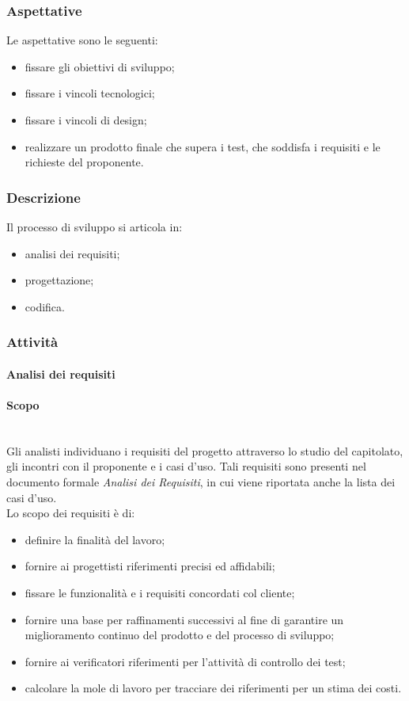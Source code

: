 \subsubsection{Aspettative}
Le aspettative sono le seguenti:
	\begin{itemize}
		\item fissare gli obiettivi di sviluppo;
		\item fissare i vincoli tecnologici;
		\item fissare i vincoli di design;
		\item realizzare un prodotto finale che supera i test, che soddisfa i 
			requisiti e le richieste del proponente.
	\end{itemize}
	
\subsubsection{Descrizione}
Il processo di sviluppo si articola in:
	\begin{itemize}
		\item analisi dei requisiti;
		\item progettazione;
		\item codifica.
	\end{itemize}
	
\subsubsection{Attività}
\paragraph{Analisi dei requisiti} 
\paragraph*{Scopo}  \mbox{}\\ 

\noindent Gli analisti individuano i requisiti del progetto attraverso lo studio del 
capitolato, gli incontri con il proponente e i casi d'uso. Tali requisiti sono 
presenti nel documento formale \textit{Analisi dei Requisiti}, in cui viene riportata 
anche la lista dei casi d'uso. \\
Lo scopo dei requisiti è di:
	\begin{itemize}
		\item definire la finalità del lavoro;
		\item fornire ai progettisti riferimenti precisi ed affidabili;
		\item fissare le funzionalità e i requisiti concordati col cliente;
		\item fornire  una  base  per  raffinamenti  successivi  al  fine  di  
			garantire  un miglioramento continuo del prodotto e del processo di sviluppo;
		\item fornire ai verificatori riferimenti per l'attività di controllo dei 
			test;
		\item calcolare la mole di lavoro per tracciare dei riferimenti per un stima 
			dei costi.
	\end{itemize}
	
